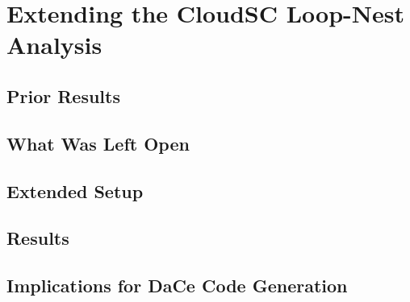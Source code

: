\chapter{Extending the CloudSC Loop-Nest Analysis}
\label{ch:cloudsc}

\section{Prior Results}

\section{What Was Left Open}

\section{Extended Setup}

\section{Results}

\section{Implications for DaCe Code Generation}
